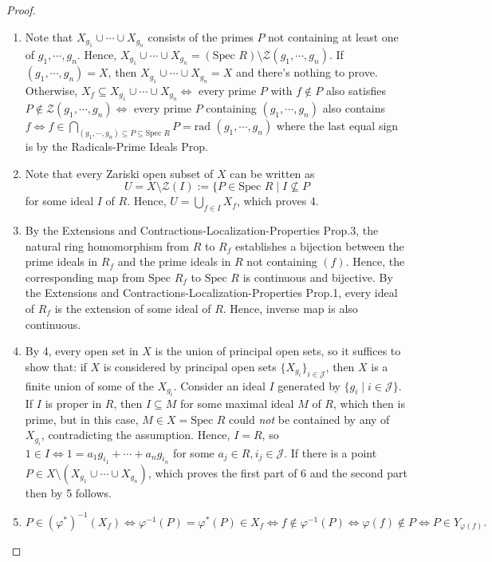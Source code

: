 \begin{proof}
\begin{enumerate}
        \item Note that $X_{g_1} \cup \cdots \cup X_{g_n}$ consists of the primes $P$ not containing at least one of $g_1 ,\cdots, g_n$. Hence, $X_{g_1} \cup \cdots \cup X_{g_n} = (\text{Spec }R) \setminus \mathcal{Z} (g_1 ,\cdots, g_n)$. If $(g_1 ,\cdots, g_n)=X$, then $X_{g_1} \cup \cdots \cup X_{g_n}=X$ and there's nothing to prove. Otherwise, $X_f \subseteq X_{g_1} \cup \cdots \cup X_{g_n} \Leftrightarrow$ every prime $P$ with $f\notin P$ also satisfies $P\notin \mathcal{Z} (g_1 ,\cdots, g_n) \Leftrightarrow$ every prime $P$ containing $(g_1 ,\cdots, g_n)$ also contains $f \Leftrightarrow f\in \bigcap_{(g_1 ,\cdots, g_n) \subseteq P \subseteq \text{Spec }R} P = \text{rad }(g_1 ,\cdots, g_n)$ where the last equal sign is by the Radicals-Prime Ideals Prop.

        \item Note that every Zariski open subset of $X$ can be written as
        $$U= X\setminus \mathcal{Z} (I) := \{P \in \text{Spec }R \mid I\not\subseteq P$$
        for some ideal $I$ of $R$. Hence, $U= \bigcup_{f\in I} X_f$, which proves 4.

        \item By the Extensions and Contractions-Localization-Properties Prop.3, the natural ring homomorphism from $R$ to $R_f$ establishes a bijection between the prime ideals in $R_f$ and the prime ideals in $R$ not containing $(f)$. Hence, the corresponding map from $\text{Spec }R_f$ to $\text{Spec }R$ is continuous and bijective. By the Extensions and Contractions-Localization-Properties Prop.1, every ideal of $R_f$ is the extension of some ideal of $R$. Hence, inverse map is also continuous.

        \item By 4, every open set in $X$ is the union of principal open sets, so it suffices to show that: if $X$ is considered by principal open sets $\{ X_{g_i} \}_{i \in \mathcal{J}}$, then $X$ is a finite union of some of the $X_{g_i}$. Consider an ideal $I$ generated by $\{g_i \mid i\in \mathcal{J} \}$. If $I$ is proper in $R$, then $I \subseteq M$ for some maximal ideal $M$ of $R$, which then is prime, but in this case, $M\in X= \text{Spec }R$ could \textit{not} be contained by any of $X_{g_i}$, contradicting the assumption. Hence, $I=R$, so $1 \in I \Leftrightarrow 1= a_1g_{i_1} + \cdots + a_ng_{i_n}$ for some $a_j\in R,i_j \in \mathcal{J}$. If there is a point $P \in X\setminus (X_{g_1} \cup \cdots \cup X_{g_n})$, which proves the first part of 6 and the second part then by 5 follows.

        \item $$P \in (\varphi^*)^{-1} (X_f) \Leftrightarrow \varphi^{-1} (P)= \varphi^*(P )\in X_f \Leftrightarrow f\notin \varphi^{-1} (P) \Leftrightarrow \varphi (f) \notin P \Leftrightarrow P\in Y_{\varphi(f)}.$$
    \end{enumerate}
\end{proof}

